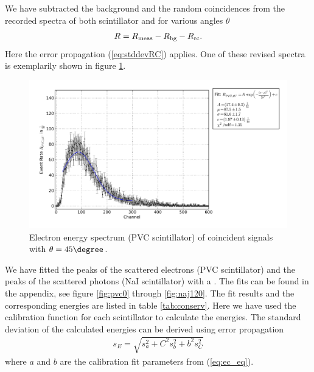 We have subtracted the background and the random coincidences from the
recorded spectra of both scintillator and for various angles $\theta$
\begin{align}
  R = R_{\mathrm{meas}} - R_{\mathrm{bg}} - R_{\mathrm{rc}}.
\end{align}
Here the error propagation (\ref{eq:stddevRC}) applies. One of these revised
spectra is exemplarily shown in figure \ref{fig:conserv45_}.
\begin{figure}[h!]
  \centering
  \includegraphics[width=\textwidth]{plots/pvc_45.png}
  \caption{Electron energy spectrum (PVC scintillator) of coincident signals
  with $\theta=45\degree$.}
  \label{fig:conserv45_}
\end{figure}

We have fitted the peaks of the scattered electrons (PVC scintillator) and
the peaks of the scattered photons (NaI scintillator) with a
. The fits can be found in the appendix, see figure
\ref{fig:pvc0} through \ref{fig:naj120}. The fit results and the corresponding energies are listed in table
\ref{tab:conserv}. Here we have used the calibration function for each scintillator to calculate the energies.
The standard deviation of the calculated energies can be derived using  error propagation
\begin{align}
  s_E = \sqrt{s_a^2 + C^2 s_b^2 + b^2 s_C^2}
\end{align}
where $a$ and $b$ are the calibration fit parameters from (\ref{eq:ec_eq}).

